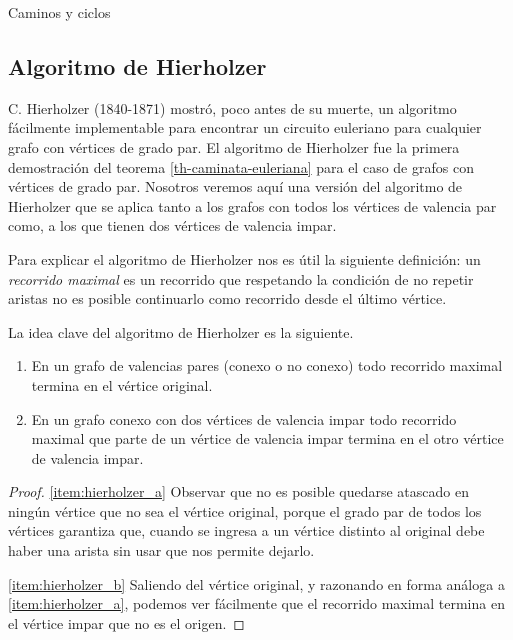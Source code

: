 \begin{section}{Caminos y ciclos}
\subsection*{Algoritmo de Hierholzer}

C. Hierholzer (1840-1871) mostró, poco antes de su muerte, un algoritmo fácilmente implementable para encontrar un circuito euleriano  para cualquier grafo  con vértices de grado  par. El algoritmo de Hierholzer fue la primera demostración del teorema \ref{th-caminata-euleriana} para el caso  de grafos con vértices de grado par. 
Nosotros veremos aquí una versión del algoritmo de Hierholzer que se aplica tanto a los grafos con todos los vértices de valencia par como, a los que tienen dos vértices de valencia impar. 

Para explicar el algoritmo de Hierholzer nos es útil la siguiente definición:  un \textit{recorrido maximal}  es un recorrido que respetando la condición de no repetir aristas no es posible continuarlo como recorrido desde el último vértice.  

La idea clave del algoritmo de Hierholzer  es la siguiente.

\begin{lema}\label{lema:hierholzer}
    \begin{enumerate}
        \item\label{item:hierholzer_a} En un grafo de valencias pares (conexo o no conexo) todo recorrido maximal termina en el vértice original.
        \item\label{item:hierholzer_b} En  un grafo conexo con dos vértices de valencia impar todo recorrido maximal que parte de un vértice de valencia impar termina en el otro vértice de valencia impar.
    \end{enumerate}
\end{lema}
\begin{proof} \ref{item:hierholzer_a}
    Observar que no es posible quedarse atascado en ningún vértice que no sea  el vértice original, porque el grado par de todos los vértices garantiza que, cuando se ingresa a un vértice distinto al original debe haber una  arista sin usar que nos permite dejarlo. 

    \ref{item:hierholzer_b} Saliendo del vértice original, y razonando en forma análoga a  \ref{item:hierholzer_a}, podemos ver fácilmente que el recorrido maximal termina en el vértice impar que no es el origen. 
\end{proof}



\end{section}

